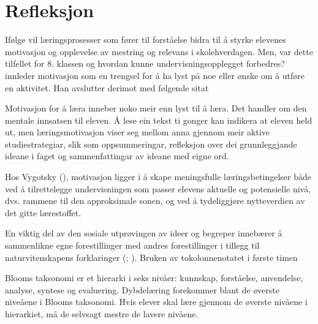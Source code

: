 \documentclass[main.tex]{subfiles}
\begin{document}
\section*{Refleksjon}
\label{sec:3}

Ifølge  vil læringsprosesser som fører til forståelse bidra til å styrke elevenes motivasjon og 
opplevelse av mestring og relevans i skolehverdagen. Men, var dette tilfellet for 8. klassen og hvordan
kunne undervisningsopplegget forbedres?
\newline
\newline
{} innleder motivasjon som en trengsel for å ha lyst på noe eller ønske om å utføre en aktivitet.
Han avslutter derimot med følgende sitat
\begin{displayquote}
\guillemotleft Motivasjon for å læra inneber noko meir enn lyst til å læra. Det handler om den mentale innsatsen til eleven.
Å lese ein tekst ti gonger kan indikera at eleven held ut, men læringsmotivasjon viser seg mellom anna gjennom
meir aktive studiestrategiar, slik som oppsummeringar, refleksjon over dei grunnleggjande ideane i faget og 
sammenfattingar av ideane med eigne ord.\guillemotright 
\end{displayquote}
Hos Vygotsky (), motivasjon ligger i å skape meningsfulle læringsbetingelser både ved å tilrettelegge 
undervisningen som passer elevens aktuelle og potensielle nivå, dvs. rammene til den approksimale sonen, og ved å tydeliggjøre 
nytteverdien av det gitte lærestoffet. 

En viktig del av den sosiale utprøvingen av ideer og begreper innebærer å sammenlikne egne forestillinger
med andres forestillinger i tillegg til naturvitenskapens forklaringer (; ).
Bruken av tokolonnenotatet i første timen 

Blooms taksonomi er et hierarki i seks nivåer: kunnskap, forståelse, anvendelse, analyse, syntese og evaluering. Dybdelæring forekommer blant de øverste niveåene
i Blooms taksonomi. Hvis elever skal lære gjennom de øverste nivåene i hierarkiet, må de selvsagt mestre de lavere nivåene.
\end{document}
